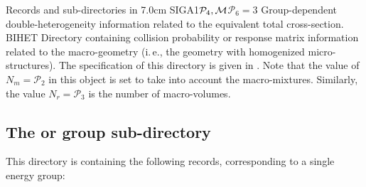 \begin{DescriptionEnregistrement}{Records and sub-directories in }{7.0cm}
\OptRealEnr
  {SIGA1}{$\mathcal{P}_{4},{\cal M}$}{$\mathcal{P}_{6}=3$}{}
  {Group-dependent double-heterogeneity information related to the equivalent total cross-section.}
\DirEnr
  {BIHET}
  {Directory containing collision probability or response matrix information related to the macro-geometry (i.$\,$e., 
  the geometry with homogenized micro-structures). The specification of this directory is given in .
  Note that the value of $N_{m}=\mathcal{P}_{2}$ in this object is set to take into account the macro-mixtures. Similarly,
  the value $N_{r}=\mathcal{P}_{3}$ is the number of macro-volumes.}
\end{DescriptionEnregistrement}

\vskip -0.5cm

\subsection{The  or  group sub-directory}\label{sect:asminfodirgroup}

This directory is containing the following records, corresponding to a single energy group:

